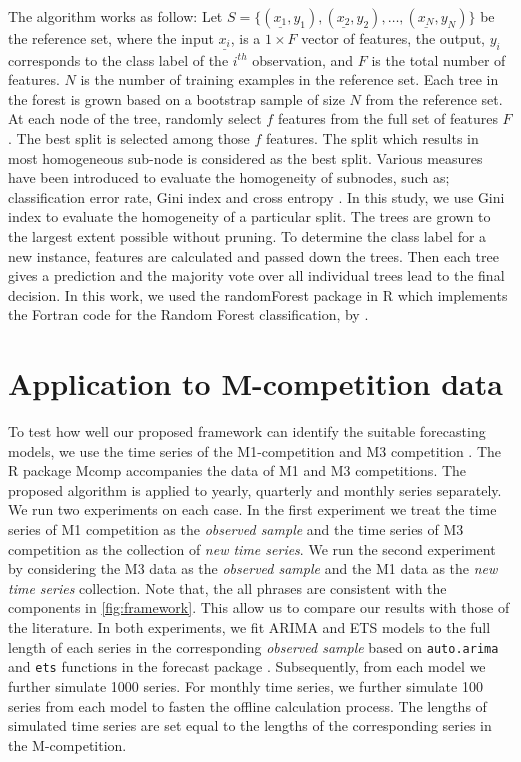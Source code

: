 \documentclass[11pt,a4paper,]{article}
\theoremstyle{definition}
\theoremstyle{definition}
\theoremstyle{definition}
\theoremstyle{remark}
\begin{document}
The algorithm works as follow: Let
\(S=\{(\underline{x_1}, y_1), (\underline{x_2}, y_2), \dots, (\underline{x_N}, y_N)\}\)
be the reference set, where the input \(\underline{x_i}\), is a
\(1\times F\) vector of features, the output, \(y_i\) corresponds to the
class label of the \(i^{th}\) observation, and \(F\) is the total number
of features. \(N\) is the number of training examples in the reference
set. Each tree in the forest is grown based on a bootstrap sample of
size \(N\) from the reference set. At each node of the tree, randomly
select \(f\) features from the full set of features \(F\). The best
split is selected among those \(f\) features. The split which results in
most homogeneous sub-node is considered as the best split. Various
measures have been introduced to evaluate the homogeneity of subnodes,
such as; classification error rate, Gini index and cross entropy
\autocite{friedman2001elements}. In this study, we use Gini index to
evaluate the homogeneity of a particular split. The trees are grown to
the largest extent possible without pruning. To determine the class
label for a new instance, features are calculated and passed down the
trees. Then each tree gives a prediction and the majority vote over all
individual trees lead to the final decision. In this work, we used the
randomForest package \autocite{liaw2002randomforest} in R which
implements the Fortran code for the Random Forest classification, by
\textcite{breiman2004random}.

\section{Application to M-competition
data}\label{application-to-m-competition-data}

To test how well our proposed framework can identify the suitable
forecasting models, we use the time series of the M1-competition
\autocite{makridakis1982accuracy} and M3 competition
\autocite{makridakis2000m3}. The R package Mcomp \autocite{hyndmanmcomp}
accompanies the data of M1 and M3 competitions. The proposed algorithm
is applied to yearly, quarterly and monthly series separately. We run
two experiments on each case. In the first experiment we treat the time
series of M1 competition as the \emph{observed sample} and the time
series of M3 competition as the collection of \emph{new time series}. We
run the second experiment by considering the M3 data as the
\emph{observed sample} and the M1 data as the \emph{new time series}
collection. Note that, the all phrases are consistent with the
components in \autoref{fig:framework}. This allow us to compare our
results with those of the literature. In both experiments, we fit ARIMA
and ETS models to the full length of each series in the corresponding
\emph{observed sample} based on \texttt{auto.arima} and \texttt{ets}
functions in the forecast package \autocite{Hyndman2008}. Subsequently,
from each model we further simulate 1000 series. For monthly time
series, we further simulate 100 series from each model to fasten the
offline calculation process. The lengths of simulated time series are
set equal to the lengths of the corresponding series in the
M-competition.
\end{document}
